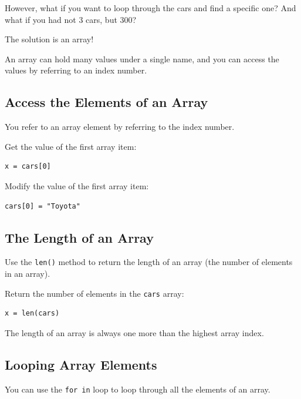 \documentclass[12pt,a4paper]{article}
\newcommand{\code}[1]{%
	\colorbox{backcolour}{\lstinline{#1}}%
}
\newcommand{\lcode}[1]{%
	\lstinline{#1}%
}
\begin{document}
However, what if you want to loop through the cars and find a specific one? And
what if you had not 3 cars, but 300?

The solution is an array!

An array can hold many values under a single name, and you can access the
values by referring to an index number.
\subsection{Access the Elements of an Array}

You refer to an array element by referring to the index number.

\begin{ebox}
Get the value of the first array item:
	\begin{lstlisting}
x = cars[0]
	\end{lstlisting}
\end{ebox}

\begin{ebox}
Modify the value of the first array item:
	\begin{lstlisting}
cars[0] = "Toyota"
	\end{lstlisting}
\end{ebox}
\subsection{The Length of an Array}

Use the \code{len()} method to return the length of an array (the number of elements in an array).

\begin{ebox}
Return the number of elements in the \lcode{cars} array:
	\begin{lstlisting}
x = len(cars)
	\end{lstlisting}
\end{ebox}

\begin{nbox}
The length of an array is always one more than the highest array index.
\end{nbox}
\subsection{Looping Array Elements}

You can use the \code{for in} loop to loop through all the elements of an array.
\end{document}
